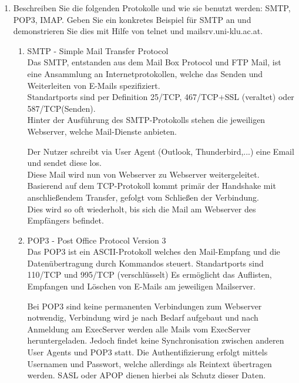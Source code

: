 \documentclass[11pt]{article}
\begin{document}
\begin{enumerate}[\thesection .1]
    \item Beschreiben Sie die folgenden Protokolle und wie sie benutzt werden: SMTP,
POP3, IMAP. Geben Sie ein konkretes Beispiel für SMTP an und demonstrieren
Sie dies mit Hilfe von telnet und mailsrv.uni-klu.ac.at.
    \begin{enumerate}[$\diamond$]
        \item SMTP - Simple Mail Transfer Protocol\\
        Das SMTP, entstanden aus dem Mail Box Protocol und FTP Mail, ist eine Ansammlung an Internetprotokollen, welche das Senden und Weiterleiten von E-Mails spezifiziert.\\
        Standartports sind per Definition 25/TCP, 467/TCP+SSL (veraltet) oder 587/TCP(Senden).\\

        Hinter der Ausführung des SMTP-Protokolls stehen die jeweiligen Webserver, welche Mail-Dienste anbieten.
        \begin{addmargin}[1em]{1em}
            Der Nutzer schreibt via User Agent (Outlook, Thunderbird,...) eine Email und sendet diese los.\\
            Diese Mail wird nun von Webserver zu Webserver weitergeleitet.
            Basierend auf dem TCP-Protokoll kommt primär der Handshake mit anschließendem Transfer, gefolgt vom Schließen der Verbindung.\\
            Dies wird so oft wiederholt, bis sich die Mail am Webserver des Empfängers befindet.
        \end{addmargin}

        \item POP3 - Post Office Protocol Version 3\\
        Das POP3 ist ein ASCII-Protokoll welches den Mail-Empfang und die Datenübertragung durch Kommandos steuert.
        Standartports sind 110/TCP und 995/TCP (verschlüsselt)
        Es ermöglicht das Auflisten, Empfangen und Löschen von E-Mails am jeweiligen Mailserver.

        Bei POP3 sind keine permanenten Verbindungen zum Webserver notwendig, Verbindung wird je nach Bedarf aufgebaut und nach Anmeldung am ExecServer werden
        alle Mails vom ExecServer heruntergeladen. Jedoch findet keine Synchronisation zwischen anderen User Agents und POP3 statt.
        Die Authentifizierung erfolgt mittels Usernamen und Passwort, welche allerdings als Reintext übertragen werden.
        SASL oder APOP dienen hierbei als Schutz dieser Daten.


\end{enumerate}
\end{enumerate}
\end{document}
